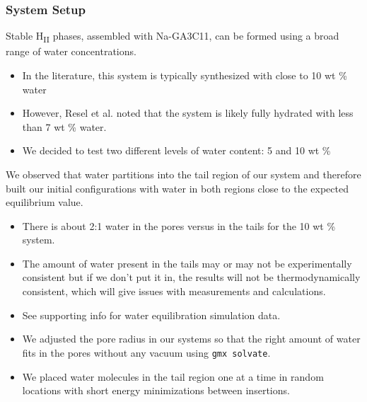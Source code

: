 \documentclass{article}
\begin{document}
  \subsubsection*{System Setup}

  Stable H\textsubscript{II} phases, assembled with Na-GA3C11, can be formed
  using a broad range of water concentrations.
  \begin{itemize}
	\item In the literature, this system is typically synthesized with close
	to 10 wt \% water \cite{smith_ordered_1997, zhou_new_2007}
    \item However, Resel et al. noted that the system is likely fully 
	hydrated with less than 7 wt \% water. \cite{resel_h2-phase_2000}
	\item We decided to test two different levels of water content: 5 and 10 wt \%
  \end{itemize} 

  We observed that water partitions into the tail region of our system and therefore
  built our initial configurations with water in both regions close to the expected
  equilibrium value.
  \begin{itemize}
	\item There is about 2:1 water in the pores versus in the tails for the 10 wt \% system.
	\item The amount of water present in the tails may or may not be experimentally consistent
	but if we don't put it in, the results will not be thermodynamically consistent, which 
	will give issues with measurements and calculations.
	\item See supporting info for water equilibration simulation data.
	\item We adjusted the pore radius in our systems so that the right amount of water
	fits in the pores without any vacuum using \texttt{gmx solvate}.
	\item We placed water molecules in the tail region one at a time in random locations
	with short energy minimizations between insertions.
  \end{itemize}

\end{document}
